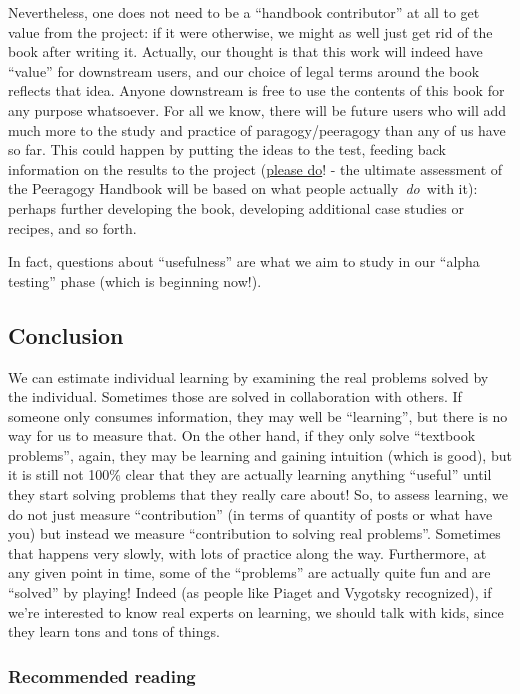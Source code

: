 Nevertheless, one does not need to be a ``handbook contributor'' at all
to get value from the project: if it were otherwise, we might as well
just get rid of the book after writing it. Actually, our thought is that
this work will indeed have ``value'' for downstream users, and our
choice of legal terms around the book reflects that idea. Anyone
downstream is free to use the contents of this book for any purpose
whatsoever. For all we know, there will be future users who will add
much more to the study and practice of paragogy/peeragogy than any of us
have so far. This could happen by putting the ideas to the test, feeding
back information on the results to the project
(\href{http://peeragogy.org/contact/}{please do}! - the ultimate
assessment of the Peeragogy Handbook will be based on what people
actually~\emph{do}~with it): perhaps further developing the book,
developing additional case studies or recipes, and so forth.

In fact, questions about ``usefulness'' are what we aim to study in our
``alpha testing'' phase (which is beginning now!).

\subsection{Conclusion}

We can estimate individual learning by examining the real problems
solved by the individual. Sometimes those are solved in collaboration
with others. If someone only consumes information, they may well be
``learning'', but there is no way for us to measure that. On the other
hand, if they only solve ``textbook problems'', again, they may be
learning and gaining intuition (which is good), but it is still not
100\% clear that they are actually learning anything ``useful'' until
they start solving problems that they really care about! So, to assess
learning, we do not just measure ``contribution'' (in terms of quantity
of posts or what have you) but instead we measure ``contribution to
solving real problems''. Sometimes that happens very slowly, with lots
of practice along the way. Furthermore, at any given point in time, some
of the ``problems'' are actually quite fun and are ``solved'' by
playing! Indeed (as people like Piaget and Vygotsky recognized), if
we're interested to know real experts on learning, we should talk with
kids, since they learn tons and tons of things.

\subsubsection{Recommended reading}

